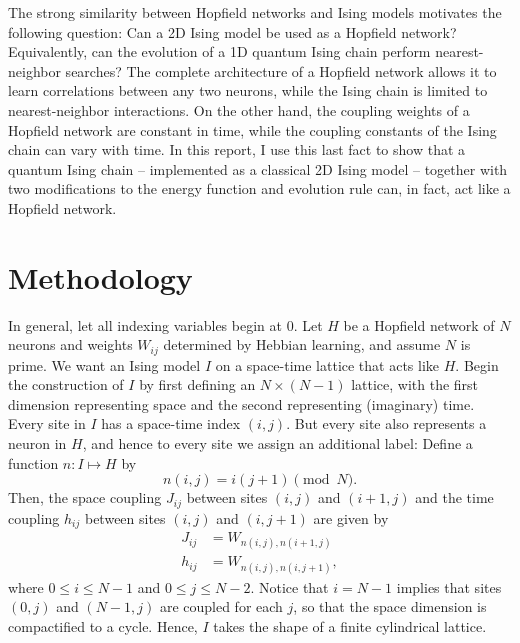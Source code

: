 \documentclass[12pt]{article}
\begin{document}
The strong similarity between Hopfield networks and Ising models motivates the following question: Can a 2D Ising model be used as a Hopfield network? Equivalently, can the evolution of a 1D quantum Ising chain perform nearest-neighbor searches? The complete architecture of a Hopfield network allows it to learn correlations between any two neurons, while the Ising chain is limited to nearest-neighbor interactions. On the other hand, the coupling weights of a Hopfield network are constant in time, while the coupling constants of the Ising chain can vary with time. In this report, I use this last fact to show that a quantum Ising chain -- implemented as a classical 2D Ising model -- together with two modifications to the energy function and evolution rule can, in fact, act like a Hopfield network.

\section{Methodology}

In general, let all indexing variables begin at $0$. Let $H$ be a Hopfield network of $N$ neurons and weights $W_{ij}$ determined by Hebbian learning, and assume $N$ is prime. We want an Ising model $I$ on a space-time lattice that acts like $H$. Begin the construction of $I$ by first defining an $N\times (N-1)$ lattice, with the first dimension representing space and the second representing (imaginary) time. Every site in $I$ has a space-time index $(i,j)$. But every site also represents a neuron in $H$, and hence to every site we assign an additional label: Define a function $n:I\mapsto H$ by
\begin{equation} \label{n}
n(i,j) = i(j+1) \pmod{N}.
\end{equation}
Then, the space coupling $J_{ij}$ between sites $(i,j)$ and $(i+1,j)$ and the time coupling $h_{ij}$ between sites $(i,j)$ and $(i,j+1)$ are given by
\begin{align}
\label{J}
J_{ij} &= W_{n(i,j),n(i+1,j)} \\
\label{h}
h_{ij} &= W_{n(i,j),n(i,j+1)},
\end{align}
where $0\leq i\leq N-1$ and $0\leq j\leq N-2$. Notice that $i=N-1$ implies that sites $(0,j)$ and $(N-1,j)$ are coupled for each $j$, so that the space dimension is compactified to a cycle. Hence, $I$ takes the shape of a finite cylindrical lattice.
\end{document}
